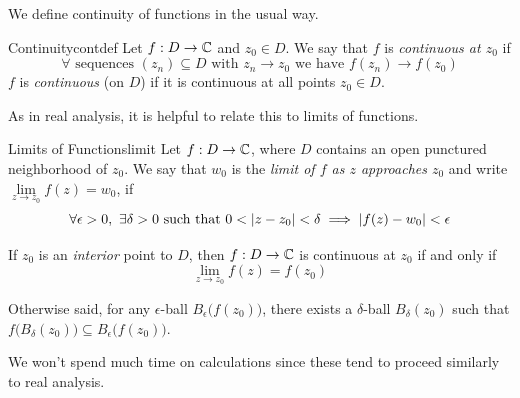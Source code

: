 We define continuity of functions in the usual way.

\begin{defn}{Continuity}{contdef}
Let $f:D\to\mathbb{C}$ and $z_0\in D$. We say that $f$ is \emph{continuous at $z_0$} if
\[\forall \text{ sequences } (z_n)\subseteq D\text{ with }z_n\to z_0\text{ we have }f(z_n)\to f(z_0)\]
$f$ is \emph{continuous} (on $D$) if it is continuous at all points $z_0\in D$.
\end{defn}
\goodbreak

As in real analysis, it is helpful to relate this to limits of functions.

\begin{defn}{Limits of Functions}{limit}
Let $f:D\to\mathbb{C}$, where $D$ contains an open punctured neighborhood of $z_0$. We say that $w_0$ is the \emph{limit of $f$ as $z$ approaches $z_0$} and write $\lim\limits_{z\to z_0}f(z)=w_0$, if
\[\forall \epsilon>0,\ \exists \delta>0\text{ such that } 0<\left| z-z_0\right|<\delta\implies \left| f(z)-w_0\right|<\epsilon\]
\end{defn}

\begin{thm}{}{}
If $z_0$ is an \emph{interior} point to $D$, then $f:D\to\mathbb{C}$ is continuous at $z_0$ if and only if
\[\lim\limits_{z\to z_0}f(z)=f(z_0)\]
\end{thm}

Otherwise said, for any $\epsilon$-ball $B_\epsilon\bigl(f(z_0)\bigr)$, there exists a $\delta$-ball $B_\delta(z_0)$ such that $f\bigl(B_\delta(z_0)\bigr)\subseteq B_\epsilon\bigl(f(z_0)\bigr)$.


We won't spend much time on calculations since these tend to proceed similarly to real analysis.

